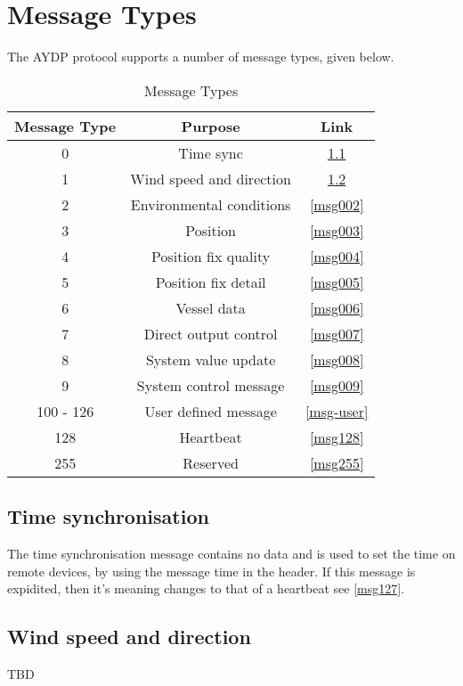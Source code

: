 \chapter{Message Types}
The AYDP protocol supports a number of message types, given below.

\begin{table}[H]
  \centering
  \begin{tabular}{ c c c }
  Message Type & Purpose & Link\\
\hline
   0 & Time sync                & \ref{msg000} \\
   1 & Wind speed and direction & \ref{msg001} \\
   2 & Environmental conditions & \ref{msg002} \\
   3 & Position                 & \ref{msg003} \\
   4 & Position fix quality     & \ref{msg004} \\
   5 & Position fix detail      & \ref{msg005} \\
   6 & Vessel data              & \ref{msg006} \\
   7 & Direct output control    & \ref{msg007} \\
   8 & System value update      & \ref{msg008} \\
   9 & System control message   & \ref{msg009} \\
 100 - 126 & User defined message & \ref{msg-user} \\ 
 128 & Heartbeat                & \ref{msg128} \\
 255 & Reserved                 & \ref{msg255} \\
  \end{tabular}
  \caption{Message Types}
  \label{table:msg:types}
\end{table}

\section{Time synchronisation}
\label{msg000}
The time synchronisation message contains no data and is used to set the time on remote devices, by using the message time in the header. If this message is expidited, then it's meaning changes to that of a heartbeat see \ref{msg127}.

\section{Wind speed and direction}
\label{msg001}
TBD

